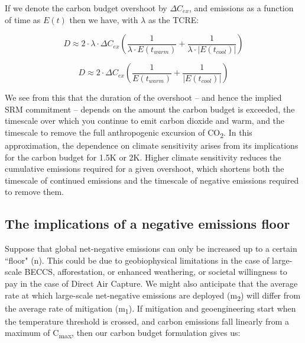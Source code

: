 \documentclass[draft]{agujournal2019}
\begin{document}
If we denote the carbon budget overshoot by $ \Delta C_{ex} $, and emissions as a function of time as $ E\left(t\right) $ then we have, with $ \lambda $ as the TCRE: 

\medskip

\begin{equation}
D \approx 2 \cdot \lambda \cdot \Delta C_{e x}\left(\frac{1}{\lambda  \cdot E\left(t_{warm}\right)}+\frac{1}{\lambda  \cdot\left|E\left(t_{cool}\right)\right|}\right)
\end{equation}



\begin{equation}
D \approx  2 \cdot \Delta C_{e x}\left(\frac{1}{E\left(t_{warm}\right)}+\frac{1}{\left|E\left(t_{cool}\right)\right|}\right)\end{equation}


\medskip

We see from this that the duration of the overshoot – and hence the implied SRM commitment – depends on the amount the carbon budget is exceeded, the timescale over which you continue to emit carbon dioxide and warm, and the timescale to remove the full anthropogenic excursion of CO\textsubscript{2}. In this approximation, the dependence on climate sensitivity arises from its implications for the carbon budget for 1.5K or 2K. Higher climate sensitivity reduces the cumulative emissions required for a given overshoot, which shortens both the timescale of continued emissions and the timescale of negative emissions required to remove them.


\subsection{The implications of a negative emissions floor}

Suppose that global net-negative emissions can only be increased up to a certain ``floor" (n). This could be due to geobiophysical limitations in the case of large-scale BECCS, afforestation, or enhanced weathering, or societal willingness to pay in the case of Direct Air Capture. We might also anticipate that the average rate at which large-scale net-negative emissions are deployed (m\textsubscript{2}) will differ from the average rate of mitigation (m\textsubscript{1}). If mitigation and geoengineering start when the temperature threshold is crossed, and carbon emissions fall linearly from a maximum of C\textsubscript{max},  then our carbon budget formulation gives us:
\end{document}
